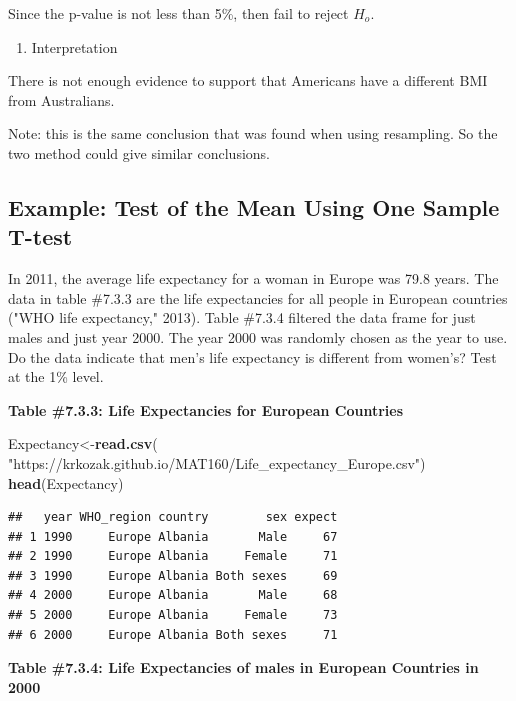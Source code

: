 \documentclass[
]{book}
\newenvironment{Shaded}{\begin{snugshade}}{\end{snugshade}}
\newcommand{\KeywordTok}[1]{\textcolor[rgb]{0.13,0.29,0.53}{\textbf{#1}}}
\newcommand{\NormalTok}[1]{#1}
\newcommand{\StringTok}[1]{\textcolor[rgb]{0.31,0.60,0.02}{#1}}
\providecommand{\tightlist}{%
  \setlength{\itemsep}{0pt}\setlength{\parskip}{0pt}}
\begin{document}
Since the p-value is not less than 5\%, then fail to reject \(H_o\).

\begin{enumerate}
\def\labelenumi{\arabic{enumi}.}
\setcounter{enumi}{5}
\tightlist
\item
  Interpretation
\end{enumerate}

There is not enough evidence to support that Americans have a different BMI from Australians.

Note: this is the same conclusion that was found when using resampling. So the two method could give similar conclusions.

\hypertarget{example-test-of-the-mean-using-one-sample-t-test-1}{%
\subsection{Example: Test of the Mean Using One Sample T-test}\label{example-test-of-the-mean-using-one-sample-t-test-1}}

In 2011, the average life expectancy for a woman in Europe was 79.8 years. The data in table \#7.3.3 are the life expectancies for all people in European countries ("WHO life expectancy," 2013). Table \#7.3.4 filtered the data frame for just males and just year 2000. The year 2000 was randomly chosen as the year to use. Do the data indicate that men's life expectancy is different from women's? Test at the 1\% level.

\textbf{Table \#7.3.3: Life Expectancies for European Countries}

\begin{Shaded}
\begin{Highlighting}[]
\NormalTok{Expectancy<-}\KeywordTok{read.csv}\NormalTok{(}
  \StringTok{"https://krkozak.github.io/MAT160/Life_expectancy_Europe.csv"}\NormalTok{)}
\KeywordTok{head}\NormalTok{(Expectancy)}
\end{Highlighting}
\end{Shaded}

\begin{verbatim}
##   year WHO_region country        sex expect
## 1 1990     Europe Albania       Male     67
## 2 1990     Europe Albania     Female     71
## 3 1990     Europe Albania Both sexes     69
## 4 2000     Europe Albania       Male     68
## 5 2000     Europe Albania     Female     73
## 6 2000     Europe Albania Both sexes     71
\end{verbatim}

\textbf{Table \#7.3.4: Life Expectancies of males in European Countries in 2000}
\end{document}
